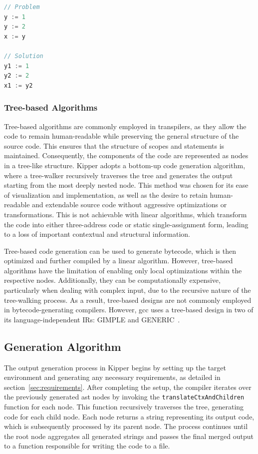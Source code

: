 \begin{lstlisting}[language=TypeScript,caption=Static single-assignment form,label=lst:implementation:staticsingleassignmentform]
// Problem
y := 1
y := 2
x := y

// Solution
y1 := 1
y2 := 2
x1 := y2
\end{lstlisting}

\subsubsection{Tree-based Algorithms}

Tree-based algorithms are commonly employed in transpilers, as they allow the code to remain human-readable while preserving the general structure of the source code. This ensures that the structure of scopes and statements is maintained. Consequently, the components of the code are represented as nodes in a tree-like structure. Kipper adopts a bottom-up code generation algorithm, where a tree-walker recursively traverses the tree and generates the output starting from the most deeply nested node. This method was chosen for its ease of visualization and implementation, as well as the desire to retain human-readable and extendable source code without aggressive optimizations or transformations. This is not achievable with linear algorithms, which transform the code into either three-address code or static single-assignment form, leading to a loss of important contextual and structural information.

Tree-based code generation can be used to generate bytecode, which is then optimized and further compiled by a linear algorithm. However, tree-based algorithms have the limitation of enabling only local optimizations within the respective nodes. Additionally, they can be computationally expensive, particularly when dealing with complex input, due to the recursive nature of the tree-walking process. As a result, tree-based designs are not commonly employed in bytecode-generating compilers. However, \acrshort{gcc} uses a tree-based design in two of its language-independent IRs: GIMPLE and GENERIC~\cite{gcc:gimpletuples}.

\subsection{Generation Algorithm}

The output generation process in Kipper begins by setting up the target environment and generating any necessary requirements, as detailed in section~\ref{sec:requirements}. After completing the setup, the compiler iterates over the previously generated \acrshort{ast} nodes by invoking the \lstinline|translateCtxAndChildren| function for each node. This function recursively traverses the tree, generating code for each child node. Each node returns a string representing its output code, which is subsequently processed by its parent node. The process continues until the root node aggregates all generated strings and passes the final merged output to a function responsible for writing the code to a file.

